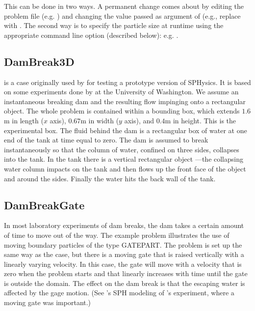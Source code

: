 \documentclass[12pt]{memoir}
\begin{document}
This can be done in two ways. A permanent change comes about by editing
the problem file (e.g. ) and changing the value
passed as argument of  (e.g., replace
 with . The second way
is to specify the particle size at runtime using the appropriate command
line option (described below): e.g. .

\subsection{DamBreak3D}

 is a case originally used by \cite{Gomez-Gesteira:2004}
for testing a prototype version of SPHysics. It is based on some
experiments done by \cite{Arnason:2005} at the University of Washington.
We assume an instantaneous breaking dam and the resulting flow impinging
onto a rectangular object. The whole problem is contained within a
bounding box, which extends $1.6$m in length ($x$ axis), $0.67$m in
width ($y$ axis), and $0.4$m in height. This is the experimental box.
The fluid behind the dam is a rectangular box of water at one end of the
tank at time equal to zero. The dam is assumed to break instantaneously
so that the column of water, confined on three sides, collapses into the
tank. In the tank there is a vertical rectangular object ---the
collapsing water column impacts on the tank and then flows up the front
face of the object and around the sides. Finally the water hits the back
wall of the tank.

\subsection{DamBreakGate}

In most laboratory experiments of dam breaks, the dam takes a certain
amount of time to move out of the way. The example problem
 illustrates the use of moving boundary particles of
the type GATEPART. The problem is set up the same way as the
 case, but there is a moving gate that is raised
vertically with a linearly varying velocity. In this case, the gate will
move with a velocity that is zero when the problem starts and that
linearly increases with time until the gate is outside the domain. The
effect on the dam break is that the escaping water is affected by the
gage motion. (See \cite{Crespo:2008}'s SPH modeling of
\cite{Janosi:2004}'s experiment, where a moving gate was important.)
\end{document}
